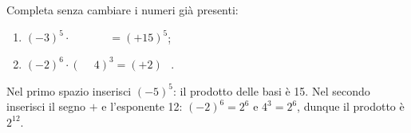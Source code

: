 
\begin{esercizio}
Completa senza cambiare i numeri già presenti:
\begin{enumerate}
\item $(-3)^5\cdot\boxed{\phantom{(-5)^5}}=(+15)^5$;
\item $(-2)^6\cdot(\boxed{\phantom{+}}4)^3=(+2)^{\boxed{\phantom{12}}}$.
\end{enumerate}
\end{esercizio}

\begin{soluzione}
Nel primo spazio inserisci $(-5)^5$: il prodotto delle basi è 15.
Nel secondo inserisci il segno $+$ e l'esponente 12:
$(-2)^6=2^6$ e $4^3=2^6$, dunque il prodotto è $2^{12}$.
\end{soluzione}
